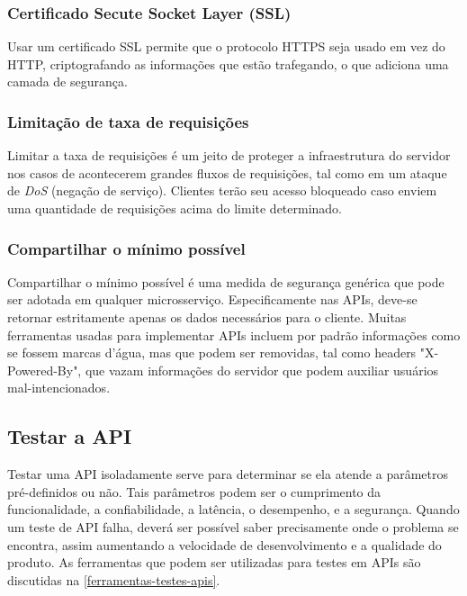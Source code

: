 \subsubsection*{Certificado Secute Socket Layer (SSL)}
Usar um certificado SSL permite que o protocolo HTTPS seja usado em vez do HTTP, criptografando as informações que estão trafegando, o que adiciona uma camada de segurança. \cite{rapidAPI-twitter}

\subsubsection*{Limitação de taxa de requisições}
Limitar a taxa de requisições é um jeito de proteger a infraestrutura do servidor nos casos de acontecerem grandes fluxos de requisições, tal como em um ataque de \emph{DoS} (negação de serviço). Clientes terão seu acesso bloqueado caso enviem uma quantidade de requisições acima do limite determinado. \cite{rapidAPI-twitter}

\subsubsection*{Compartilhar o mínimo possível}
Compartilhar o mínimo possível é uma medida de segurança genérica que pode ser adotada em qualquer microsserviço. Especificamente nas APIs, deve-se retornar estritamente apenas os dados necessários para o cliente. Muitas ferramentas usadas para implementar APIs incluem por padrão informações como se fossem marcas d'água, mas que podem ser removidas, tal como headers "X-Powered-By", que vazam informações do servidor que podem auxiliar usuários mal-intencionados. \cite{rapidAPI-twitter}

\subsection{Testar a API}
Testar uma API isoladamente serve para determinar se ela atende a parâmetros pré-definidos ou não. Tais parâmetros podem ser o cumprimento da funcionalidade, a confiabilidade, a latência, o desempenho, e a segurança. Quando um teste de API falha, deverá ser possível saber precisamente onde o problema se encontra, assim aumentando a velocidade de desenvolvimento e a qualidade do produto. As ferramentas que podem ser utilizadas para testes em APIs são discutidas na \autoref{ferramentas-testes-apis}.


